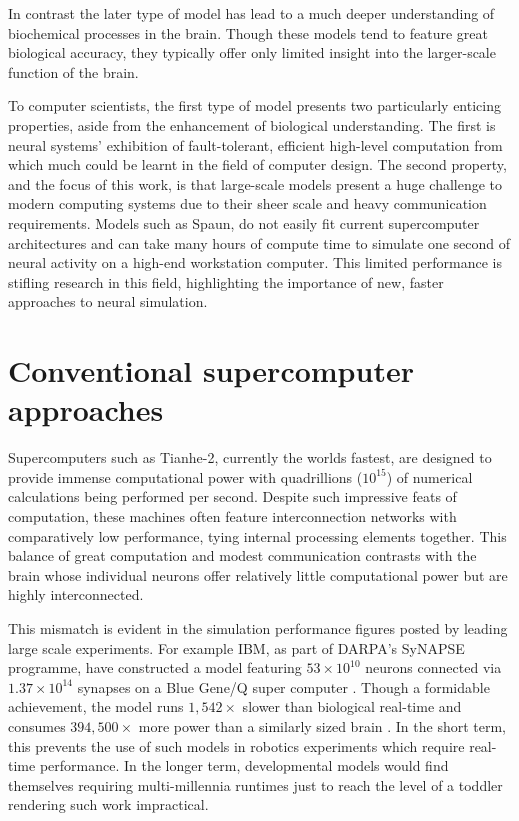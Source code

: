 		
		In contrast the later type of model has lead to a much deeper understanding
		of biochemical processes in the brain. Though these models tend to feature
		great biological accuracy, they typically offer only limited insight into
		the larger-scale function of the brain.
		
		To computer scientists, the first type of model presents two particularly
		enticing properties, aside from the enhancement of biological understanding.
		The first is neural systems' exhibition of fault-tolerant, efficient
		high-level computation from which much could be learnt in the field of
		computer design. The second property, and the focus of this work, is that
		large-scale models present a huge challenge to modern computing systems due
		to their sheer scale and heavy communication requirements. Models such as
		Spaun, do not easily fit current supercomputer architectures and can take
		many hours of compute time to simulate one second of neural activity on a
		high-end workstation computer. This limited performance is stifling research
		in this field, highlighting the importance of new, faster approaches to
		neural simulation.
	
	\section{Conventional supercomputer approaches}
	
		Supercomputers such as Tianhe-2, currently the worlds
		fastest\cite{meuer13n}, are designed to provide immense computational power
		with quadrillions ($10^{15}$) of numerical calculations being performed per
		second. Despite such impressive feats of computation, these machines often
		feature interconnection networks with comparatively low performance, tying
		internal processing elements together. This balance of great computation and
		modest communication contrasts with the brain whose individual neurons offer
		relatively little computational power but are highly interconnected.
		
		This mismatch is evident in the simulation performance figures posted by
		leading large scale experiments. For example IBM, as part of DARPA's SyNAPSE
		programme, have constructed a model featuring $53 \times 10^{10}$ neurons
		connected via $1.37 \times 10^{14}$ synapses on a Blue Gene/Q super computer
		\cite{ibm13}. Though a formidable achievement, the model runs $1,542\times$
		slower than biological real-time and consumes $394,500\times$ more power
		than a similarly sized brain \cite{drubach00}. In the short term, this
		prevents the use of such models in robotics experiments which require
		real-time performance. In the longer term, developmental models would find
		themselves requiring multi-millennia runtimes just to reach the level of a
		toddler rendering such work impractical.
		
